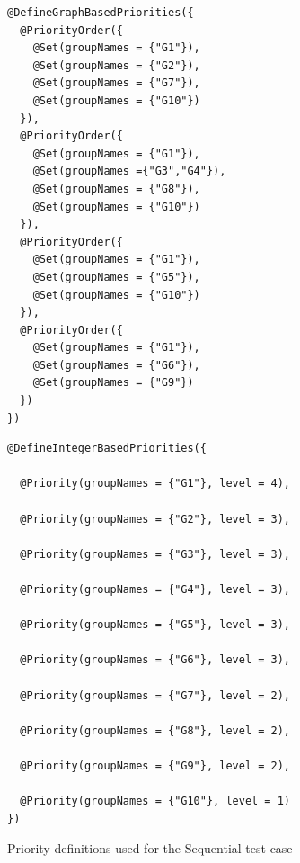 \documentclass[11pt]{report}
\begin{document}
\begin{figure}[!ht]
	\lstset{language=java, numbers=left, numberstyle=\tiny, stepnumber=1, numbersep=5pt, basicstyle=\footnotesize}
	\begin{minipage}{0.41\textwidth}
	\begin{lstlisting}[frame=single]
@DefineGraphBasedPriorities({
  @PriorityOrder({
    @Set(groupNames = {"G1"}),
    @Set(groupNames = {"G2"}),
    @Set(groupNames = {"G7"}),
    @Set(groupNames = {"G10"})
  }),
  @PriorityOrder({
    @Set(groupNames = {"G1"}),
    @Set(groupNames ={"G3","G4"}),
    @Set(groupNames = {"G8"}),
    @Set(groupNames = {"G10"})
  }),
  @PriorityOrder({
    @Set(groupNames = {"G1"}),
    @Set(groupNames = {"G5"}),
    @Set(groupNames = {"G10"})
  }),
  @PriorityOrder({
    @Set(groupNames = {"G1"}),
    @Set(groupNames = {"G6"}),
    @Set(groupNames = {"G9"})
  })
})
 	\end{lstlisting}
 	\end{minipage}
 	\hfill
	\begin{minipage}{0.55\textwidth}
	\begin{lstlisting}[frame=single]
@DefineIntegerBasedPriorities({

  @Priority(groupNames = {"G1"}, level = 4),
  
  @Priority(groupNames = {"G2"}, level = 3),
  
  @Priority(groupNames = {"G3"}, level = 3),
  
  @Priority(groupNames = {"G4"}, level = 3),
  
  @Priority(groupNames = {"G5"}, level = 3),
  
  @Priority(groupNames = {"G6"}, level = 3),
  
  @Priority(groupNames = {"G7"}, level = 2),
  
  @Priority(groupNames = {"G8"}, level = 2),
  
  @Priority(groupNames = {"G9"}, level = 2),
  
  @Priority(groupNames = {"G10"}, level = 1)
})
 	\end{lstlisting}
 	\end{minipage}	
	\caption{Priority definitions used for the Sequential test case}
	\label{fig:sequential-decl}
\end{figure}
\end{document}
